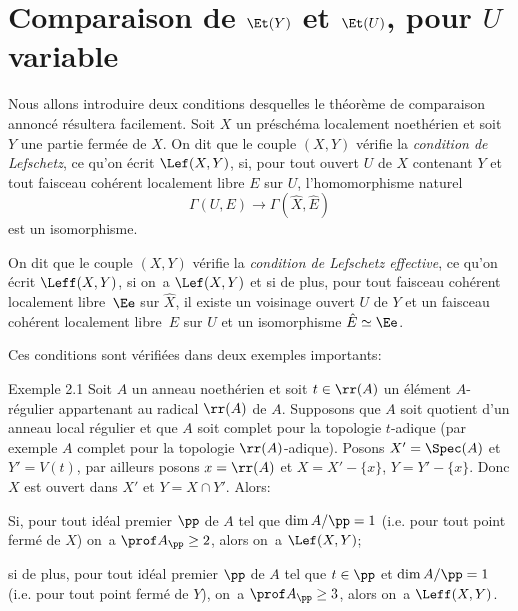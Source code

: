 \section{Comparaison de $\Et(Y)$ et $\Et(U)$, pour $U$ variable} \label{X.2}

Nous allons introduire deux conditions desquelles le th\'eor\`eme de comparaison annonc\'e r\'esultera facilement. Soit $X$ un pr\'esch\'ema localement noeth\'erien et soit $Y$ une partie ferm\'ee de $X$. On dit que le couple $(X, Y)$ v\'erifie la \emph{condition de Lefschetz}, ce qu'on \'ecrit $\Lef(X, Y)$,\label{pX.2} si, pour tout ouvert $U$ de $X$ contenant $Y$ et tout faisceau coh\'erent localement libre $E$ sur $U$, l'homomorphisme naturel
\[
\Gamma(U, E) \to \Gamma(\hat{X}, \hat{E})
\]
est un isomorphisme.

On dit que le couple $(X, Y)$ v\'erifie la \emph{condition de Lefschetz effective}, ce qu'on \'ecrit $\Leff(X, Y)$, si on~a $\Lef(X, Y)$ et si de plus, pour tout faisceau coh\'erent localement libre~$\Ee$ sur $\hat{X}$, il existe un voisinage ouvert $U$ de $Y$ et un faisceau coh\'erent localement libre~$E$ sur $U$ et un isomorphisme $\hat{E}\simeq\Ee$.

Ces conditions sont v\'erifi\'ees dans deux exemples importants:

\label{X.2.1}
\begin{enonce*}[remark]{Exemple 2.1\ndemark}
 Soit $A$ un anneau noeth\'erien et soit $t\in \rr(A)$ un \'el\'ement $A$-r\'egulier appartenant au radical $\rr(A)$ de $A$. Supposons que $A$ soit quotient d'un anneau local r\'egulier et que $A$ soit complet pour la topologie $t$-adique (par exemple $A$ complet pour la topologie $\rr(A)$-adique). Posons $X'=\Spec(A)$ et $Y'=V(t)$, par ailleurs posons $x=\rr(A)$ et $X=X'-\{x\}$, $Y=Y'-\{x\}$. Donc $X$ est ouvert dans $X'$ et $Y=X\cap Y'$. Alors:
\begin{enumeratei}
\item
Si, pour tout id\'eal premier $\pp$ de $A$ tel que $\dim A/\pp=1$ (i.e. pour tout point ferm\'e de $X$) on~a $\prof A_{\pp}\geq 2$, alors on~a $\Lef(X, Y)$;

\item
si de plus, pour tout id\'eal premier $\pp$ de $A$ tel que $t\in\pp$ et $\dim A/\pp=1$ (i.e. pour tout point ferm\'e de $Y$), on~a $\prof A_{\pp}\geq 3$, alors on~a $\Leff(X, Y)$.
\end{enumeratei}
\end{enonce*}

